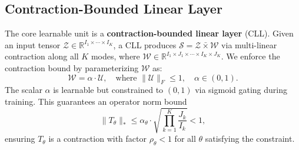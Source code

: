 \documentclass[12pt]{article}
\begin{document}
\subsection{Contraction-Bounded Linear Layer}

The core learnable unit is a \textbf{contraction-bounded linear layer} (CLL). Given an input tensor $\mathcal{Z} \in \mathbb{R}^{I_1 \times \cdots \times I_K}$, a CLL produces $\mathcal{S} = \mathcal{Z} \bar{\times} \mathcal{W}$ via multi-linear contraction along all $K$ modes, where $\mathcal{W} \in \mathbb{R}^{I_1 \times J_1 \times \cdots \times I_K \times J_K}$. We enforce the contraction bound by parameterizing $\mathcal{W}$ as:
\begin{equation}
\mathcal{W} = \alpha \cdot \mathcal{U}, \quad \text{where } \|\mathcal{U}\|_F \leq 1, \quad \alpha \in (0, 1).
\label{eq:cll}
\end{equation}
The scalar $\alpha$ is learnable but constrained to $(0, 1)$ via sigmoid gating during training. This guarantees an operator norm bound
\begin{equation}
\|T_\theta\|_* \leq \alpha_\theta \cdot \sqrt{\prod_{k=1}^K \frac{J_k}{I_k}} < 1,
\label{eq:operator_bound}
\end{equation}
ensuring $T_\theta$ is a contraction with factor $\rho_\theta < 1$ for all $\theta$ satisfying the constraint.
\end{document}
